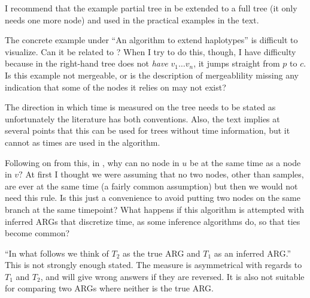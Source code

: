 \reply{
}

\begin{point}{} %
I recommend that the example partial tree in  be
extended to a full tree (it only needs one more node) and used in
the practical examples in the text.
\end{point}


\begin{point}{} %
The concrete example under ``An algorithm to extend haplotypes'' is
difficult to visualize. Can it be related to ? When I try to
do this, though, I have difficulty because in  the right-hand
tree does not \emph{have} $v_1 \ldots v_n$, it jumps straight from $p$ to $c.$ Is
this example not mergeable, or is the description of mergeablility
missing any indication that some of the nodes it relies on may not
exist?
\end{point}

\reply{
}

\begin{point}{} %
The direction in which time is measured on the tree needs to be stated
as unfortunately the literature has both conventions. Also, the text
implies at several points that this can be used for trees without
time information, but it cannot as times are used in the algorithm.
\end{point}

\reply{
}

\begin{point}{}
Following on from this, in , why can no node in $u$ be at the
same time as a node in $v?$ At first I thought we were assuming that no
two nodes, other than samples, are ever at the same time (a fairly
common assumption) but then we would not need this rule. Is this just
a convenience to avoid putting two nodes on the same branch at the same
timepoint? What happens if this algorithm is attempted with inferred
ARGs that discretize time, as some inference algorithms do, so that ties
become common?
\end{point}

\reply{
}

\begin{point}{} %
``In what follows we think of $T_2$ as the true ARG and $T_1$ as an
inferred ARG.'' This is not strongly enough stated. The measure is
asymmetrical with regards to $T_1$ and $T_2$, and will give wrong answers
if they are reversed. It is also not suitable for comparing two
ARGs where neither is the true ARG.
\end{point}

